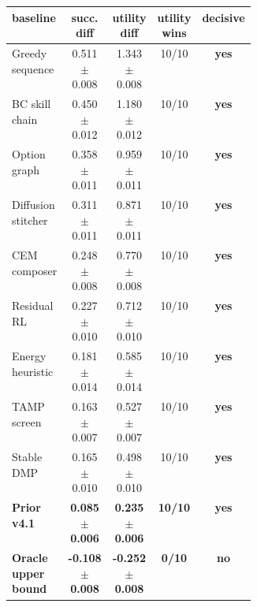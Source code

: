 \begingroup
\setlength{\tabcolsep}{3pt}
\renewcommand{\arraystretch}{1.08}
\begin{tabular}{@{}p{0.36\linewidth}cccc@{}}
\rowcolor{TableHeader}
\textbf{baseline} & \textbf{succ. diff} & \textbf{utility diff} & \textbf{utility wins} & \textbf{decisive} \\
\midrule
Greedy sequence & 0.511 $\pm$ 0.008 & 1.343 $\pm$ 0.008 & 10/10 & \textcolor{TableGreen}{\textbf{yes}} \\
\rowcolor{TableBand}
BC skill chain & 0.450 $\pm$ 0.012 & 1.180 $\pm$ 0.012 & 10/10 & \textcolor{TableGreen}{\textbf{yes}} \\
Option graph & 0.358 $\pm$ 0.011 & 0.959 $\pm$ 0.011 & 10/10 & \textcolor{TableGreen}{\textbf{yes}} \\
\rowcolor{TableBand}
Diffusion stitcher & 0.311 $\pm$ 0.011 & 0.871 $\pm$ 0.011 & 10/10 & \textcolor{TableGreen}{\textbf{yes}} \\
CEM composer & 0.248 $\pm$ 0.008 & 0.770 $\pm$ 0.008 & 10/10 & \textcolor{TableGreen}{\textbf{yes}} \\
\rowcolor{TableBand}
Residual RL & 0.227 $\pm$ 0.010 & 0.712 $\pm$ 0.010 & 10/10 & \textcolor{TableGreen}{\textbf{yes}} \\
Energy heuristic & 0.181 $\pm$ 0.014 & 0.585 $\pm$ 0.014 & 10/10 & \textcolor{TableGreen}{\textbf{yes}} \\
\rowcolor{TableBand}
TAMP screen & 0.163 $\pm$ 0.007 & 0.527 $\pm$ 0.007 & 10/10 & \textcolor{TableGreen}{\textbf{yes}} \\
Stable DMP & 0.165 $\pm$ 0.010 & 0.498 $\pm$ 0.010 & 10/10 & \textcolor{TableGreen}{\textbf{yes}} \\
\rowcolor{TableBaseline}
\textbf{Prior v4.1} & \textbf{0.085 $\pm$ 0.006} & \textbf{0.235 $\pm$ 0.006} & \textbf{10/10} & \textcolor{TableGreen}{\textbf{yes}} \\
\rowcolor{TableOracle}
\textbf{Oracle upper bound} & \textbf{-0.108 $\pm$ 0.008} & \textbf{-0.252 $\pm$ 0.008} & \textbf{0/10} & \textcolor{TableRed}{\textbf{no}} \\
\bottomrule
\end{tabular}
\endgroup
